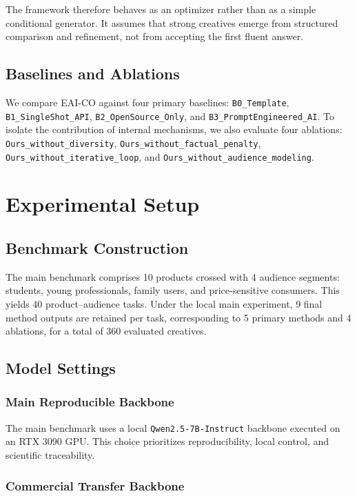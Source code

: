 \documentclass[applsci,article,submit,pdftex,moreauthors]{Definitions/mdpi}
\begin{document}
The framework therefore behaves as an optimizer rather than as a simple conditional generator. It assumes that strong creatives emerge from structured comparison and refinement, not from accepting the first fluent answer.

\subsection{Baselines and Ablations}

We compare EAI-CO against four primary baselines: \texttt{B0\_Template}, \texttt{B1\_SingleShot\_API}, \texttt{B2\_OpenSource\_Only}, and \texttt{B3\_PromptEngineered\_AI}. To isolate the contribution of internal mechanisms, we also evaluate four ablations: \texttt{Ours\_without\_diversity}, \texttt{Ours\_without\_factual\_penalty}, \texttt{Ours\_without\_iterative\_loop}, and \texttt{Ours\_without\_audience\_modeling}.

\section{Experimental Setup}

\subsection{Benchmark Construction}

The main benchmark comprises 10 products crossed with 4 audience segments: students, young professionals, family users, and price-sensitive consumers. This yields 40 product--audience tasks. Under the local main experiment, 9 final method outputs are retained per task, corresponding to 5 primary methods and 4 ablations, for a total of 360 evaluated creatives.

\subsection{Model Settings}

\subsubsection{Main Reproducible Backbone}

The main benchmark uses a local \texttt{Qwen2.5-7B-Instruct} backbone executed on an RTX 3090 GPU. This choice prioritizes reproducibility, local control, and scientific traceability.

\subsubsection{Commercial Transfer Backbone}
\end{document}
